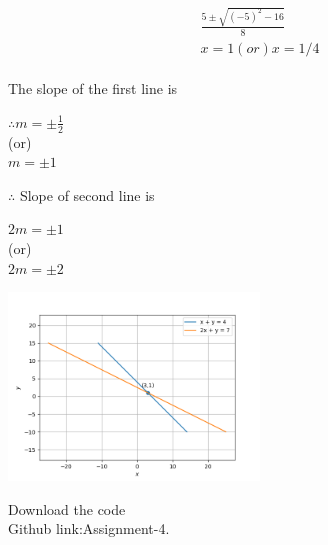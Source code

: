 \documentclass[10pt,a4paper]{report}
\begin{document}
\begin{multicols}{2}
\begin{align}
	\frac{5\pm \sqrt{\left (-5\right )^2 - 16}}{8}
	\\
	x= 1 (or) x = 1/4
\end{align}
\\
The slope of the first line is
\\
\begin{center}
$ \therefore m=\pm \frac{1}{2}$\\
    (or)\\
    $m=\pm 1$
\end{center}
$\therefore $ Slope of second line is
\begin{center}
$ 2m=\pm 1$\\
    (or)\\
    $2m=\pm 2$
\end{center}
\begin{center}
 \includegraphics[width=0.5\textwidth]{line.png}  
 \end{center}\vspace{1mm}
\raggedright  Download the code \\
Github link:{Assignment-4}.
\end{multicols}
\end{document}

